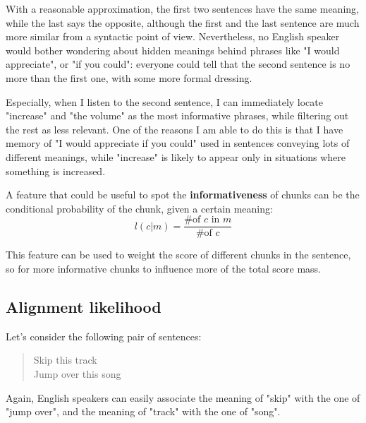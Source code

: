 With a reasonable approximation, the first two sentences have the same meaning, while the last says the opposite, although the first and the last sentence are much more similar from a syntactic point of view. Nevertheless, no English speaker would bother wondering about hidden meanings behind phrases like "I would appreciate", or "if you could": everyone could tell that the second sentence is no more than the first one, with some more formal dressing.

Especially, when I listen to the second sentence, I can immediately locate "increase" and "the volume" as the most informative phrases, while filtering out the rest as less relevant. One of the reasons I am able to do this is that I have memory of "I would appreciate if you could" used in sentences conveying lots of different meanings, while "increase" is likely to appear only in situations where something is increased.

A feature that could be useful to spot the \textbf{informativeness} of chunks can be the conditional probability of the chunk, given a certain meaning:
$$
l(c|m)=\frac{\text{\# of }c\text{ in }m}{\text{\# of }c}
$$

This feature can be used to weight the score of different chunks in the sentence, so for more informative chunks to influence more of the total score mass.
\subsection{Alignment likelihood}\label{ch3:ml:al}
Let's consider the following pair of sentences:
\begin{quote}
Skip this track \\
Jump over this song
\end{quote}
Again, English speakers can easily associate the meaning of "skip" with the one of "jump over", and the meaning of "track" with the one of "song".

